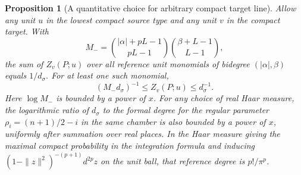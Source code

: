 \documentclass[a4paper,11pt]{article}
\newtheorem{proposition}{Proposition}[section]
\theoremstyle{definition}
\theoremstyle{remark}
\numberwithin{equation}{section}
\begin{document}
\begin{proposition}[A quantitative choice for arbitrary compact target line]
\label{prop:mono185}
Allow any unit \(u\) in the lowest compact source type and
any unit \(v\) in the compact target. With
\[
 M_-=\binom{|\alpha|+pL-1}{pL-1}\binom{\beta+L-1}{L-1},
\]
the sum of \(Z_v(P;u)\) over all reference unit monomials
of bidegree \((|\alpha|,\beta)\) equals \(1/d_\sigma\).
For at least one such monomial,
\[
      (M_-d_\sigma)^{-1}\le Z_v(P;u)\le d_\sigma^{-1}.
\]
Here \(\log M_-\) is bounded by a power of \(x\). For any
choice of real Haar measure, the logarithmic ratio of
\(d_\sigma\) to the formal degree for the regular parameter
\(\rho_i=(n+1)/2-i\) in the same chamber is also bounded by
a power of \(x\), uniformly after summation over real places.
In the Haar measure giving the maximal compact probability
in the integration formula and inducing
\((1-\|z\|^2)^{-(p+1)}d^{2p}z\) on the unit ball, that
reference degree is \(p!/\pi^p\).
\end{proposition}
\end{document}
